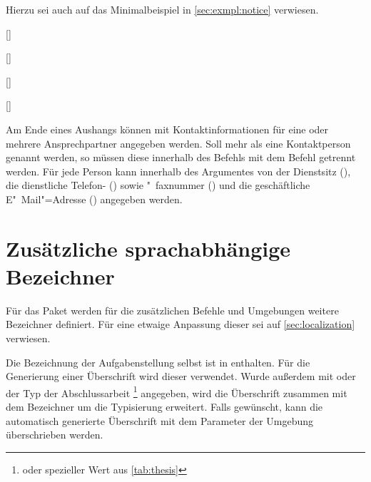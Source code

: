 \begin{Bundle*}{}
\begin{Example}
\begin{Code}[escapechar=§]
{  Bild (optional), einzubinden mit:
    \texttt{[image: §\\PName\{Datei]}§}
}{%
  \item Schwerpunkt 1
  \item Schwerpunkt 2
}
\end{Code}
Hierzu sei auch auf das Minimalbeispiel in \autoref{sec:exmpl:notice} verwiesen.
%
\end{Example}

\begin{Declaration}[v2.02]{[]}
\begin{Declaration}{[]}
\begin{Declaration}[v2.02]{[]}
\begin{Declaration}[v2.05]{[]}

\printdeclarationlist%
%
Am Ende eines Aushangs können mit  Kontaktinformationen 
für eine oder mehrere Ansprechpartner angegeben werden. Soll mehr als eine 
Kontaktperson genannt werden, so müssen diese innerhalb des Befehls
 mit dem Befehl  getrennt werden. Für jede 
Person kann innerhalb des Argumentes von  der Dienstsitz 
(), die dienstliche Telefon- () sowie "~faxnummer
() und die geschäftliche E"~Mail"=Adresse () 
angegeben werden.
\end{Declaration}
\end{Declaration}
\end{Declaration}
\end{Declaration}



\section{Zusätzliche sprachabhängige Bezeichner}
%
%
Für das Paket  werden für die zusätzlichen Befehle 
und Umgebungen weitere Bezeichner definiert. Für eine etwaige Anpassung dieser 
sei auf \autoref{sec:localization} verwiesen.

\begin{Declaration}{}
\begin{Declaration}{}
\printdeclarationlist%
%
Die Bezeichnung der Aufgabenstellung selbst ist in  enthalten. 
Für die Generierung einer Überschrift wird dieser verwendet. Wurde außerdem mit 
 oder  der Typ der Abschlussarbeit%
\footnote{%
   oder spezieller Wert aus \autoref{tab:thesis}%
}
angegeben, wird die Überschrift zusammen mit dem Bezeichner 
um die Typisierung erweitert. Falls gewünscht, kann die automatisch generierte 
Überschrift mit dem Parameter  der Umgebung 
 überschrieben werden.
\end{Declaration}
\end{Declaration}


\end{Bundle*}
